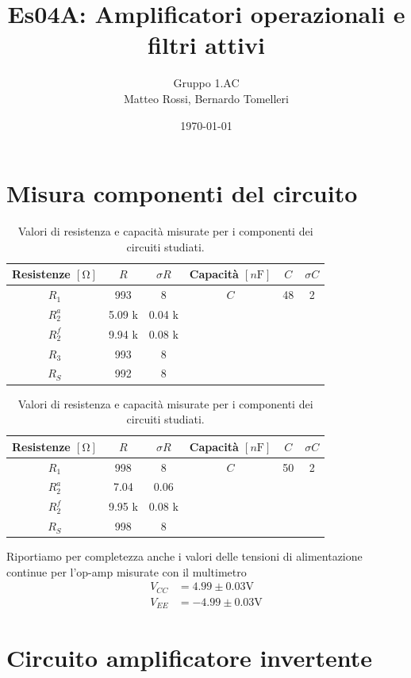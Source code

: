 \documentclass[10pt,a4paper]{article}
\author{Gruppo 1.AC \\ Matteo Rossi, Bernardo Tomelleri}
\title{Es04A: Amplificatori operazionali e filtri attivi}
\begin{document}
\date{\today}
\maketitle

\setcounter{section}{0}

\section*{Misura componenti del circuito}
\begin{table}[htbp]
\centering
\begin{tabular}{cccccc}
\toprule
Resistenze $[\si{\ohm}]$ & $R$ & $\sigma R$ & Capacità $[\si{n\F}]$ & $C$ &
$\sigma C$ \\
\midrule
\midrule
$R_1$	  & 993 	& 8 	 & $C$ & 48			 & 2 \\
$R_2^a$	  & 5.09 k	& 0.04 k 	 & & &	\\
$R_2^f$	  & 9.94 k		& 0.08 k & 		& 		 &	\\
$R_3$	  & 993		& 8		 &				&				 &		\\
$R_S$	  & 992		& 8		 &				&				 &		\\
\bottomrule     
\end{tabular}
\caption{Valori di resistenza e capacità misurate per i componenti dei
circuiti studiati. \label{tab: rcmes_B}}

\begin{tabular}{cccccc}
\toprule
Resistenze $[\si{\ohm}]$ & $R$ & $\sigma R$ & Capacità $[\si{n\F}]$ & $C$ &
$\sigma C$ \\
\midrule
\midrule
$R_1$	  & 998 	& 8 	 & $C$ & 50			 & 2 \\
$R_2^a$	  & 7.04	& 0.06 	 & & &	\\
$R_2^f$	  & 9.95 k	& 0.08 k & & &	\\
$R_S$	  & 998		& 8		 & & &	\\
\bottomrule     
\end{tabular}
\caption{Valori di resistenza e capacità misurate per i componenti dei
circuiti studiati. \label{tab: rcmes_M}}
\end{table}
Riportiamo per completezza anche i valori delle tensioni di alimentazione
continue per l'op-amp misurate con il multimetro
\begin{align*}
V_{CC} &= 4.99 \pm 0.03 \si{\V} \\
V_{EE} &= -4.99 \pm 0.03 \si{\V}
\end{align*}

\section{Circuito amplificatore invertente}
\end{document}
